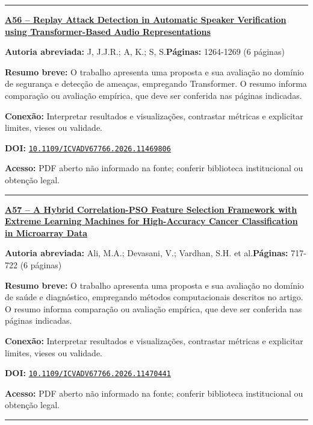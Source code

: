 \documentclass[10pt,a4paper]{article}
\begin{document}
\noindent\rule{\textwidth}{0.35pt}
\par\medskip\noindent
{\large\bfseries\href{https://doi.org/10.1109/ICVADV67766.2026.11469806}{A56 -- Replay Attack Detection in Automatic Speaker Verification using Transformer-Based Audio Representations}}\par\smallskip
\textbf{Autoria abreviada:} J, J.J.R.; A, K.; S, S.\quad \textbf{Páginas:} 1264-1269 (6 páginas)\par
\textbf{Resumo breve:} O trabalho apresenta uma proposta e sua avaliação no domínio de segurança e detecção de ameaças, empregando Transformer. O resumo informa comparação ou avaliação empírica, que deve ser conferida nas páginas indicadas.\par
\textbf{Conexão:} Interpretar resultados e visualizações, contrastar métricas e explicitar limites, vieses ou validade.\par
\textbf{DOI:} \href{https://doi.org/10.1109/ICVADV67766.2026.11469806}{\nolinkurl{10.1109/ICVADV67766.2026.11469806}}\par
\textbf{Acesso:} PDF aberto não informado na fonte; conferir biblioteca institucional ou obtenção legal.\par
\noindent\rule{\textwidth}{0.35pt}
\par\medskip\noindent
{\large\bfseries\href{https://doi.org/10.1109/ICVADV67766.2026.11470441}{A57 -- A Hybrid Correlation-PSO Feature Selection Framework with Extreme Learning Machines for High-Accuracy Cancer Classification in Microarray Data}}\par\smallskip
\textbf{Autoria abreviada:} Ali, M.A.; Devasani, V.; Vardhan, S.H. et al.\quad \textbf{Páginas:} 717-722 (6 páginas)\par
\textbf{Resumo breve:} O trabalho apresenta uma proposta e sua avaliação no domínio de saúde e diagnóstico, empregando métodos computacionais descritos no artigo. O resumo informa comparação ou avaliação empírica, que deve ser conferida nas páginas indicadas.\par
\textbf{Conexão:} Interpretar resultados e visualizações, contrastar métricas e explicitar limites, vieses ou validade.\par
\textbf{DOI:} \href{https://doi.org/10.1109/ICVADV67766.2026.11470441}{\nolinkurl{10.1109/ICVADV67766.2026.11470441}}\par
\textbf{Acesso:} PDF aberto não informado na fonte; conferir biblioteca institucional ou obtenção legal.\par
\noindent\rule{\textwidth}{0.35pt}
\par\medskip\noindent
\end{document}
